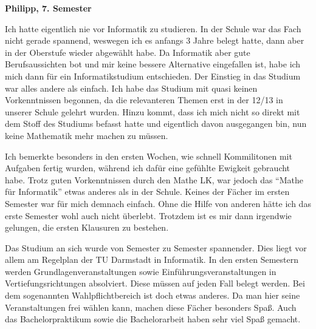 {\textbf{Philipp, 7. Semester}

Ich hatte eigentlich nie vor Informatik zu studieren. In der Schule war das Fach nicht gerade spannend, weswegen ich es anfangs 3 Jahre belegt hatte, dann aber in der Oberstufe wieder abgewählt habe. Da Informatik aber gute Berufsaussichten bot und mir keine bessere Alternative eingefallen ist, habe ich mich dann für ein Informatikstudium entschieden. Der Einstieg in das Studium war alles andere als einfach. Ich habe das Studium mit quasi keinen Vorkenntnissen begonnen, da die relevanteren Themen erst in der 12/13 in unserer Schule gelehrt wurden. Hinzu kommt, dass ich mich nicht so direkt mit dem Stoff des Studiums befasst hatte und eigentlich davon ausgegangen bin, nun keine Mathematik mehr machen zu müssen.

Ich bemerkte besonders in den ersten Wochen, wie schnell Kommilitonen mit Aufgaben fertig wurden, während ich dafür eine gefühlte Ewigkeit gebraucht habe. Trotz guten Vorkenntnissen durch den Mathe LK, war jedoch das "`Mathe für Informatik"' etwas anderes als in der Schule. Keines der Fächer im ersten Semester war für mich demnach einfach. Ohne die Hilfe von anderen hätte ich das erste Semester wohl auch nicht überlebt. Trotzdem ist es mir dann irgendwie gelungen, die ersten Klausuren zu bestehen.

Das Studium an sich wurde von Semester zu Semester spannender. Dies liegt vor allem am Regelplan der TU Darmstadt in Informatik. In den ersten Semestern werden Grundlagenveranstaltungen sowie Einführungsveranstaltungen in Vertiefungsrichtungen absolviert. Diese müssen auf jeden Fall belegt werden. Bei dem sogenannten Wahlpflichtbereich ist doch etwas anderes. Da man hier seine Veranstaltungen frei wählen kann, machen diese Fächer besonders Spaß. Auch das Bachelorpraktikum sowie die Bachelorarbeit haben sehr viel Spaß gemacht.

}
